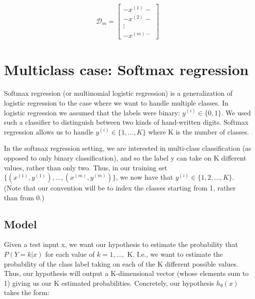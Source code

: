 \begin{align}
	\mathcal{D}_m = 
	\left[
		\begin{array}{cccc}
			- x^{(1)} - \\
			- x^{(2)} -  \\ 
			\vdots \\
			- x^{(m) - } 
		\end{array}
	\right]
\end{align}










\section{Multiclass case: Softmax regression}


Softmax regression (or multinomial logistic regression) is a generalization of logistic regression to the case where we want to handle multiple classes. In logistic regression we assumed that the labels were binary: $y^{(i)} \in \{0,1\}$. We used such a classifier to distinguish between two kinds of hand-written digits. Softmax regression allows us to handle $ y^{(i)} \in \{1,\ldots,K\}$ where K is the number of classes.

In the softmax regression setting, we are interested in multi-class classification (as opposed to only binary classification), and so the label y can take on K different values, rather than only two. Thus, in our training set $\{ (x^{(1)}, y^{(1)}), \ldots, (x^{(m)}, y^{(m)}) \}$, we now have that $y^{(i)} \in \{1, 2, \ldots, K\}$. (Note that our convention will be to index the classes starting from 1, rather than from 0.) 

\subsection{Model}

Given a test input x, we want our hypothesis to estimate the probability that $P(Y=k | x)$ for each value of $k = 1, \ldots,$ K. I.e., we want to estimate the probability of the class label taking on each of the K different possible values. Thus, our hypothesis will output a K-dimensional vector (whose elements sum to 1) giving us our K estimated probabilities. Concretely, our hypothesis $h_{\theta}(x)$ takes the form:

